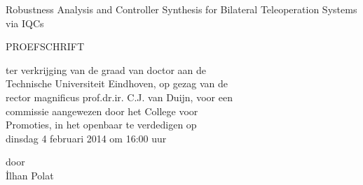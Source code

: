 \newcommand{\ilhant}{Robustness Analysis and Controller Synthesis for Bilateral Teleoperation Systems via IQCs}
\newcommand{\ilhans}{}  
\newcommand*{\ilhana}{İlhan Polat}
{\sffamily
%
%
%
\thispagestyle{empty}
\vspace*{20mm}

\begin{center}
    \huge\ilhant
\end{center}

\vspace{10mm}

\begin{center}PROEFSCHRIFT\end{center}

\vspace{10mm}


\begin{center}
ter verkrijging van de graad van doctor aan de\\
Technische Universiteit Eindhoven, op gezag van de\\
rector magnificus prof.dr.ir. C.J. van Duijn, voor een\\
commissie aangewezen door het College voor\\
Promoties, in het openbaar te verdedigen op\\
dinsdag 4 februari 2014 om 16:00 uur
\vspace{15mm}

door\\
\vspace{15mm}
\ilhana


\end{center}}
